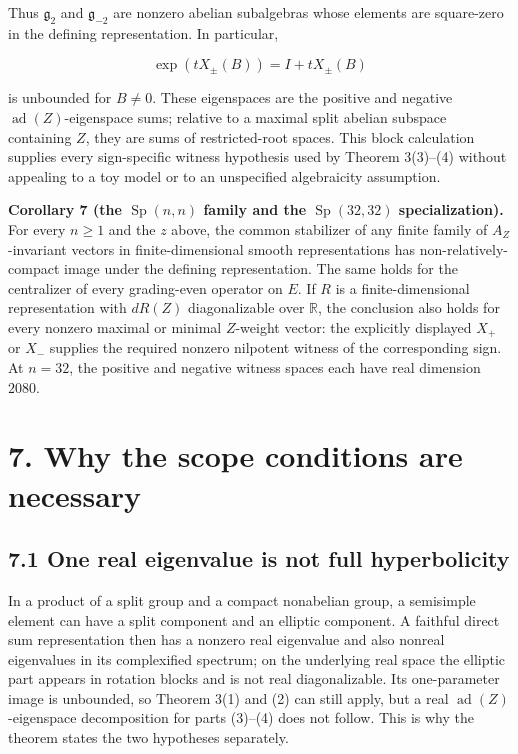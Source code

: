 \documentclass[
  10pt,
  letterpaper,
  oneside]{scrartcl}
\begin{document}
Thus \(\mathfrak g_2\) and \(\mathfrak g_{-2}\) are nonzero abelian
subalgebras whose elements are square-zero in the defining
representation. In particular,

\[
\exp(tX_\pm(B))=I+tX_\pm(B)
\]

is unbounded for \(B\ne0\). These eigenspaces are the positive and
negative \(\operatorname{ad}(Z)\)-eigenspace sums; relative to a maximal
split abelian subspace containing \(Z\), they are sums of
restricted-root spaces. This block calculation supplies every
sign-specific witness hypothesis used by Theorem 3(3)--(4) without
appealing to a toy model or to an unspecified algebraicity assumption.

\textbf{Corollary 7 (the \(\operatorname{Sp}(n,n)\) family and the
\(\operatorname{Sp}(32,32)\) specialization).} For every \(n\geq1\) and
the \(z\) above, the common stabilizer of any finite family of
\(A_Z\)-invariant vectors in finite-dimensional smooth representations
has non-relatively-compact image under the defining representation. The
same holds for the centralizer of every grading-even operator on \(E\).
If \(R\) is a finite-dimensional representation with \(dR(Z)\)
diagonalizable over \(\mathbb R\), the conclusion also holds for every
nonzero maximal or minimal \(Z\)-weight vector: the explicitly displayed
\(X_+\) or \(X_-\) supplies the required nonzero nilpotent witness of
the corresponding sign. At \(n=32\), the positive and negative witness
spaces each have real dimension \(2080\).

\section{7. Why the scope conditions are
necessary}\label{why-the-scope-conditions-are-necessary}

\subsection{7.1 One real eigenvalue is not full
hyperbolicity}\label{one-real-eigenvalue-is-not-full-hyperbolicity}

In a product of a split group and a compact nonabelian group, a
semisimple element can have a split component and an elliptic component.
A faithful direct sum representation then has a nonzero real eigenvalue
and also nonreal eigenvalues in its complexified spectrum; on the
underlying real space the elliptic part appears in rotation blocks and
is not real diagonalizable. Its one-parameter image is unbounded, so
Theorem 3(1) and (2) can still apply, but a real
\(\operatorname{ad}(Z)\)-eigenspace decomposition for parts (3)--(4)
does not follow. This is why the theorem states the two hypotheses
separately.
\end{document}
